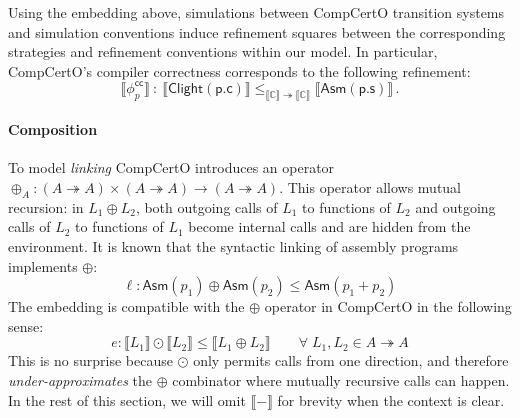 \documentclass[acmsmall,screen,review,nonacm]{acmart}
\newcommand{\kw}[1]{\ensuremath{ \mathsf{#1} }}
\begin{document}
Using the embedding above,
simulations between CompCertO transition systems and simulation conventions
induce refinement squares between 
the corresponding strategies and refinement conventions within our model.
In particular,
CompCertO's compiler correctness
corresponds to the following refinement:
\[
  \llbracket \phi_p^\kw{cc} \rrbracket \: : \:
      \llbracket \kw{Clight}(\kw{p.c}) \rrbracket
      \le_{\llbracket \mathbb{C} \rrbracket
        \twoheadrightarrow \llbracket\mathbb{C}\rrbracket}
      \llbracket \kw{Asm}(\kw{p.s}) \rrbracket
  \,.
\]

\paragraph{Composition}
To model \textit{linking}
CompCertO introduces
an operator
$\oplus_A : (A \twoheadrightarrow A) \times (A \twoheadrightarrow A) \rightarrow (A \twoheadrightarrow A)$.
This operator allows
mutual recursion:
in $L_1 \oplus L_2$,
both outgoing calls of $L_1$ to functions of $L_2$
and outgoing calls of $L_2$ to functions of $L_1$
become internal calls
and are hidden from the environment.
It is known that
the syntactic linking
of assembly programs
implements $\oplus$:
\[
  \ell :
  \kw{Asm}(p_1) \oplus \kw{Asm}(p_2) \le
  \kw{Asm}(p_1 + p_2)
\]%
The embedding is compatible
with the $\oplus$ operator in CompCertO
in the following sense:
\[
  \mathit{e}: \llbracket L_1 \rrbracket \odot \llbracket L_2 \rrbracket
    \le  \llbracket L_1 \oplus L_2 \rrbracket
  \qquad \forall \; L_1, L_2 \in A \twoheadrightarrow A
\]
This is no surprise because
$\odot$ only permits calls
from one direction,
and therefore \emph{under-approximates}
the $\oplus$ combinator
where mutually recursive calls can happen.
In the rest of this section,
we will omit $\llbracket - \rrbracket$
for brevity
when the context is clear.
\end{document}
